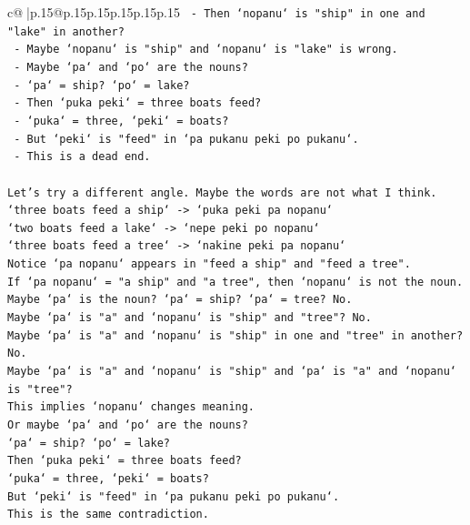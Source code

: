 \documentclass{article}
\begin{document}
{\begin{supertabular}{c@{$\;$}|p{.15\linewidth}@{}p{.15\linewidth}p{.15\linewidth}p{.15\linewidth}p{.15\linewidth}p{.15\linewidth}}
{{{\texttt{          {-} Then `nopanu` is "ship" in one and "lake" in another?} \\
\texttt{          {-} Maybe `nopanu` is "ship" and `nopanu` is "lake" is wrong.} \\
\texttt{          {-} Maybe `pa` and `po` are the nouns?} \\
\texttt{          {-} `pa` = ship? `po` = lake?} \\
\texttt{          {-} Then `puka peki` = three boats feed?} \\
\texttt{          {-} `puka` = three, `peki` = boats?} \\
\texttt{          {-} But `peki` is "feed" in `pa pukanu peki po pukanu`.} \\
\texttt{          {-} This is a dead end.} \\
\\ 
\texttt{Let's try a different angle. Maybe the words are not what I think.} \\
\texttt{`three boats feed a ship` {-}> `puka peki pa nopanu`} \\
\texttt{`two boats feed a lake` {-}> `nepe peki po nopanu`} \\
\texttt{`three boats feed a tree` {-}> `nakine peki pa nopanu`} \\
\texttt{Notice `pa nopanu` appears in "feed a ship" and "feed a tree".} \\
\texttt{If `pa nopanu` = "a ship" and "a tree", then `nopanu` is not the noun.} \\
\texttt{Maybe `pa` is the noun? `pa` = ship? `pa` = tree? No.} \\
\texttt{Maybe `pa` is "a" and `nopanu` is "ship" and "tree"? No.} \\
\texttt{Maybe `pa` is "a" and `nopanu` is "ship" in one and "tree" in another? No.} \\
\texttt{Maybe `pa` is "a" and `nopanu` is "ship" and `pa` is "a" and `nopanu` is "tree"?} \\
\texttt{This implies `nopanu` changes meaning.} \\
\texttt{Or maybe `pa` and `po` are the nouns?} \\
\texttt{`pa` = ship? `po` = lake?} \\
\texttt{Then `puka peki` = three boats feed?} \\
\texttt{`puka` = three, `peki` = boats?} \\
\texttt{But `peki` is "feed" in `pa pukanu peki po pukanu`.} \\
\texttt{This is the same contradiction.} \\
}}}
\end{supertabular}}
\end{document}
